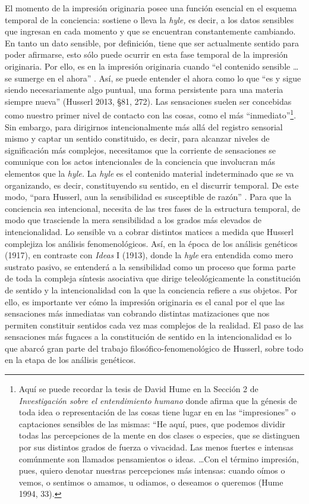 El momento de la impresión originaria posee una función esencial en el
esquema temporal de la conciencia: sostiene o lleva la \emph{hyle,} es
decir, a los datos sensibles que ingresan en cada momento y que se
encuentran constantemente cambiando. En tanto un dato sensible, por
definición, tiene que ser actualmente sentido para poder afirmarse, esto
sólo puede ocurrir en esta fase temporal de la impresión originaria. Por
ello, es en la impresión originaria cuando ``el contenido sensible
\ldots se sumerge en el ahora'' \cite[p.~173]{mensch2022}. Así, se puede
entender el ahora como lo que ``es y sigue siendo necesariamente algo
puntual, una forma persistente para una materia siempre nueva'' (Husserl
2013, §81, 272). Las sensaciones suelen ser concebidas como nuestro
primer nivel de contacto con las cosas, como el más
``inmediato''\footnote{Aquí se puede recordar la tesis de David Hume en
  la Sección 2 de \emph{Investigación sobre el entendimiento humano}
  donde afirma que la génesis de toda idea o representación de las cosas
  tiene lugar en en las ``impresiones'' o captaciones sensibles de las
  mismas: ``He aquí, pues, que podemos dividir todas las percepciones de
  la mente en dos clases o especies, que se distinguen por sus distintos
  grados de fuerza o vivacidad. Las menos fuertes e intensas comúnmente
  son llamados pensamientos o ideas. \ldots Con el término impresión,
  pues, quiero denotar nuestras percepciones más intensas: cuando oímos
  o vemos, o sentimos o amamos, u odiamos, o deseamos o queremos (Hume
  1994, 33).}. Sin embargo, para dirigirnos intencionalmente más allá
del registro sensorial mismo y captar un sentido constituido, es decir,
para alcanzar niveles de significación más complejos, necesitamos que la
corriente de sensaciones se comunique con los actos intencionales de la
conciencia que involucran más elementos que la \emph{hyle.} La
\emph{hyle} es el contenido material indeterminado que se va
organizando, es decir, constituyendo su sentido, en el discurrir
temporal. De este modo, ``para Husserl, aun la sensibilidad es
susceptible de razón'' \cite[p.~119]{levinas2004}. Para que la conciencia sea
intencional, necesita de las tres fases de la estructura temporal, de
modo que trasciende la mera sensibilidad a los grados más elevados de
intencionalidad. Lo sensible va a cobrar distintos matices a medida que
Husserl complejiza los análisis fenomenológicos. Así, en la época de los
análisis genéticos (1917), en contraste con \emph{Ideas} I (1913), donde
la \emph{hyle} era entendida como mero sustrato pasivo, se entenderá a
la sensibilidad como un proceso que forma parte de toda la compleja
síntesis asociativa que dirige teleológicamente la constitución de
sentido y la intencionalidad con la que la conciencia refiere a sus
objetos. Por ello, es importante ver cómo la impresión originaria es el
canal por el que las sensaciones más inmediatas van cobrando distintas
matizaciones que nos permiten constituir sentidos cada vez mas complejos
de la realidad. El paso de las sensaciones más fugaces a la constitución
de sentido en la intencionalidad es lo que abarcó gran parte del trabajo
filosófico-fenomenológico de Husserl, sobre todo en la etapa de los
análisis genéticos.

